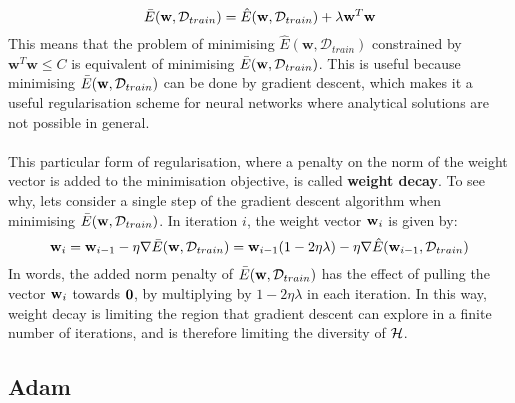 $$
\bar{E}(\mathbf{w}, \mathcal{D}_{train}) = \hat{E}(\mathbf{w}, \mathcal{D}_{train}) + \lambda\mathbf{w}^T\mathbf{w}
$$
This means that the problem of minimising $\hat{E}(\mathbf{w}, \mathcal{D}_{train})$ constrained by $\mathbf{w}^T\mathbf{w} \leq C$ is equivalent of minimising $\bar{E}(\mathbf{w}, \mathcal{D}_{train})$. This is useful because minimising $\bar{E}(\mathbf{w}, \mathcal{D}_{train})$ can be done by gradient descent, which makes it a useful regularisation scheme for neural networks where analytical solutions are not possible in general.
\\\\
This particular form of regularisation, where a penalty on the norm of the weight vector is added to the minimisation objective, is called \textbf{weight decay}. To see why, lets consider a single step of the gradient descent algorithm when minimising $\bar{E}(\mathbf{w}, \mathcal{D}_{train})$. In iteration $i$, the weight vector $\mathbf{w}_i$ is given by:
$$
\mathbf{w}_i = \mathbf{w}_{i-1} - \eta \nabla \bar{E}(\mathbf{w}, \mathcal{D}_{train}) = \mathbf{w}_{i-1}(1 - 2\eta\lambda) - \eta \nabla \hat{E}(\mathbf{w}_{i-1}, \mathcal{D}_{train})	
$$
In words, the added norm penalty of $\bar{E}(\mathbf{w}, \mathcal{D}_{train})$ has the effect of pulling the vector $\mathbf{w}_i$ towards $\mathbf{0}$, by multiplying by $1 - 2\eta\lambda$ in each iteration. In this way, weight decay is limiting the region that gradient descent can explore in a finite number of iterations, and is therefore limiting the diversity of $\mathcal{H}$.

\subsection{Adam}
\label{adam}